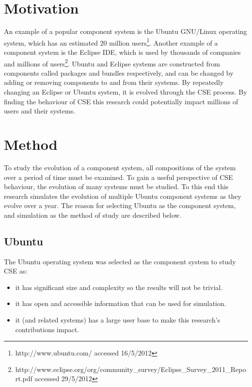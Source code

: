 \section{Motivation}
An example of a popular component system is the Ubuntu GNU/Linux operating system, which has an estimated 20 million users\footnote{http://www.ubuntu.com/ accessed 16/5/2012}. 
Another example of a component system is the Eclipse IDE, which is used by thousands of companies and millions of users\footnote{http://www.eclipse.org/org/community\_survey/Eclipse\_Survey\_2011\_Report.pdf  accessed 29/5/2012}.
Ubuntu and Eclipse systems are constructed from components called packages and bundles respectively, 
and can be changed by adding or removing components to and from their systems.
By repeatedly changing an Eclipse or Ubuntu system, it is evolved through the CSE process.
By finding the behaviour of CSE this research could potentially impact millions of users and their systems.

\section{Method}
To study the evolution of a component system, all compositions of the system over a period of time must be examined. 
To gain a useful perspective of CSE behaviour, the evolution of many systems must be studied.
To this end this research simulates the evolution of multiple Ubuntu component systems as they evolve over a year.
The reason for selecting Ubuntu as the component system, and simulation as the method of study are described below.

\subsection{Ubuntu}
The Ubuntu operating system was selected as the component system to study CSE as:
\begin{itemize}
  \item it has significant size and complexity so the results will not be trivial.
  \item it has open and accessible information that can be used for simulation.
  \item it (and related systems) has a large user base to make this research's contributions impact.
\end{itemize} 


